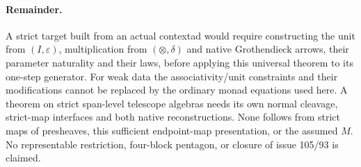 \paragraph{Remainder.}
A strict target built from an actual contextad would require constructing
the unit from $(I,\varepsilon)$, multiplication from $(\otimes,\delta)$
and native Grothendieck arrows, their parameter naturality and their
laws, before applying this universal theorem to its one-step generator.
For weak data the associativity/unit constraints and their modifications
cannot be replaced by the ordinary monad equations used here. A theorem
on strict span-level telescope algebras needs its own normal cleavage,
strict-map interfaces and both native reconstructions. None follows
from strict maps of presheaves, this sufficient endpoint-map
presentation, or the assumed $M$. No representable restriction,
four-block pentagon, or closure of issue 105/93 is claimed.
